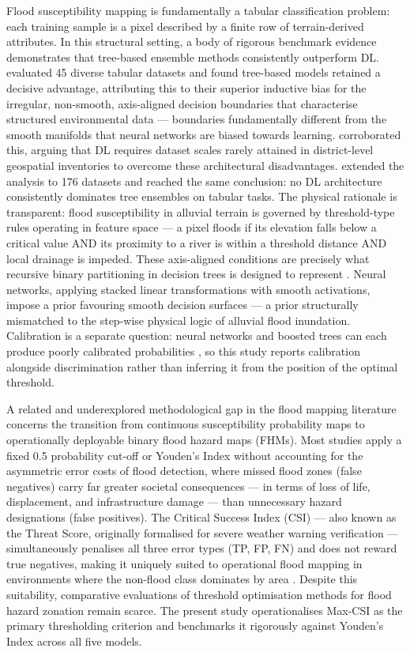 \documentclass[12pt, a4paper]{article}
\begin{document}
Flood susceptibility mapping is fundamentally a tabular classification problem: each training sample is a pixel described by a finite row of terrain-derived attributes. In this structural setting, a body of rigorous benchmark evidence demonstrates that tree-based ensemble methods consistently outperform DL. \citet{grinsztajn2022} evaluated 45 diverse tabular datasets and found tree-based models retained a decisive advantage, attributing this to their superior inductive bias for the irregular, non-smooth, axis-aligned decision boundaries that characterise structured environmental data --- boundaries fundamentally different from the smooth manifolds that neural networks are biased towards learning. \citet{shwartzziv2022} corroborated this, arguing that DL requires dataset scales rarely attained in district-level geospatial inventories to overcome these architectural disadvantages. \citet{mcelfresh2023} extended the analysis to 176 datasets and reached the same conclusion: no DL architecture consistently dominates tree ensembles on tabular tasks. The physical rationale is transparent: flood susceptibility in alluvial terrain is governed by threshold-type rules operating in feature space --- a pixel floods if its elevation falls below a critical value AND its proximity to a river is within a threshold distance AND local drainage is impeded. These axis-aligned conditions are precisely what recursive binary partitioning in decision trees is designed to represent \citep{breiman2001, Popov2021}. Neural networks, applying stacked linear transformations with smooth activations, impose a prior favouring smooth decision surfaces --- a prior structurally mismatched to the step-wise physical logic of alluvial flood inundation. Calibration is a separate question: neural networks and boosted trees can each produce poorly calibrated probabilities \citep{Niculescu-Mizil2005, zadrozny2002}, so this study reports calibration alongside discrimination rather than inferring it from the position of the optimal threshold.

A related and underexplored methodological gap in the flood mapping literature concerns the transition from continuous susceptibility probability maps to operationally deployable binary flood hazard maps (FHMs). Most studies apply a fixed 0.5 probability cut-off or Youden's Index \citep{youden1950} without accounting for the asymmetric error costs of flood detection, where missed flood zones (false negatives) carry far greater societal consequences --- in terms of loss of life, displacement, and infrastructure damage --- than unnecessary hazard designations (false positives). The Critical Success Index (CSI) --- also known as the Threat Score, originally formalised for severe weather warning verification \citep{schaefer1990} --- simultaneously penalises all three error types (TP, FP, FN) and does not reward true negatives, making it uniquely suited to operational flood mapping in environments where the non-flood class dominates by area \citep{mason2003, Pham2021, nguyen2021}. Despite this suitability, comparative evaluations of threshold optimisation methods for flood hazard zonation remain scarce. The present study operationalises Max-CSI as the primary thresholding criterion and benchmarks it rigorously against Youden's Index across all five models.
\end{document}
